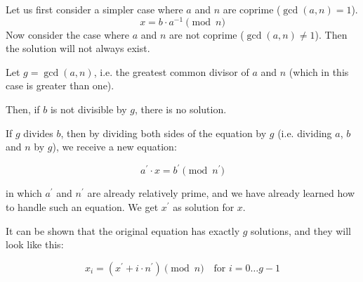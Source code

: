 \documentclass[8pt, a4paper, oneside, twocolumn]{extarticle}
\begin{document}
Let us first consider a simpler case where $a$ and $n$ are coprime ($\gcd(a, n) = 1$). 
$$x = b \cdot a ^ {- 1} \pmod n$$
Now consider the case where $a$ and $n$ are not coprime ($\gcd(a, n) \ne 1$). Then the solution will not always exist.

Let $g = \gcd(a, n)$, i.e. the greatest common divisor of $a$ and $n$ (which in this case is greater than one).

Then, if $b$ is not divisible by $g$, there is no solution. 

If $g$ divides $b$, then by dividing both sides of the equation by $g$ (i.e. dividing $a$, $b$ and $n$ by $g$), we receive a new equation:

$$a^\prime \cdot x = b^\prime \pmod{n^\prime}$$

in which $a^\prime$ and $n^\prime$ are already relatively prime, and we have already learned how to handle such an equation. We get $x^\prime$ as solution for $x$.

It can be shown that the original equation has exactly $g$ solutions, and they will look like this:

$$x_i = (x^\prime + i\cdot n^\prime) \pmod n \quad \text{for } i = 0 \ldots g-1$$
\end{document}
